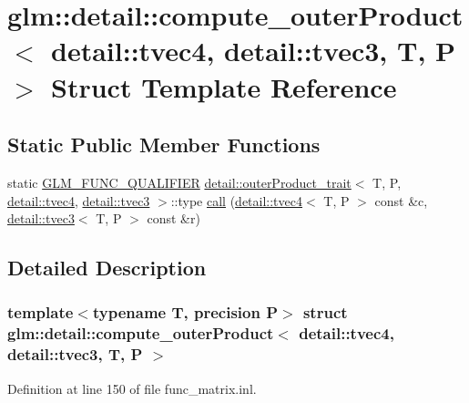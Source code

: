 \hypertarget{structglm_1_1detail_1_1compute__outer_product_3_01detail_1_1tvec4_00_01detail_1_1tvec3_00_01_t_00_01_p_01_4}{}\section{glm\+:\+:detail\+:\+:compute\+\_\+outer\+Product$<$ detail\+:\+:tvec4, detail\+:\+:tvec3, T, P $>$ Struct Template Reference}
\label{structglm_1_1detail_1_1compute__outer_product_3_01detail_1_1tvec4_00_01detail_1_1tvec3_00_01_t_00_01_p_01_4}
\subsection*{Static Public Member Functions}
\begin{DoxyCompactItemize}
\item 
static \hyperlink{setup_8hpp_a33fdea6f91c5f834105f7415e2a64407}{G\+L\+M\+\_\+\+F\+U\+N\+C\+\_\+\+Q\+U\+A\+L\+I\+F\+I\+ER} \hyperlink{structglm_1_1detail_1_1outer_product__trait}{detail\+::outer\+Product\+\_\+trait}$<$ T, P, \hyperlink{structglm_1_1detail_1_1tvec4}{detail\+::tvec4}, \hyperlink{structglm_1_1detail_1_1tvec3}{detail\+::tvec3} $>$\+::type \hyperlink{structglm_1_1detail_1_1compute__outer_product_3_01detail_1_1tvec4_00_01detail_1_1tvec3_00_01_t_00_01_p_01_4_a7e5367e91d2b8d7863f6e5b277317c45}{call} (\hyperlink{structglm_1_1detail_1_1tvec4}{detail\+::tvec4}$<$ T, P $>$ const \&c, \hyperlink{structglm_1_1detail_1_1tvec3}{detail\+::tvec3}$<$ T, P $>$ const \&r)
\end{DoxyCompactItemize}


\subsection{Detailed Description}
\subsubsection*{template$<$typename T, precision P$>$\newline
struct glm\+::detail\+::compute\+\_\+outer\+Product$<$ detail\+::tvec4, detail\+::tvec3, T, P $>$}



Definition at line 150 of file func\+\_\+matrix.\+inl.



